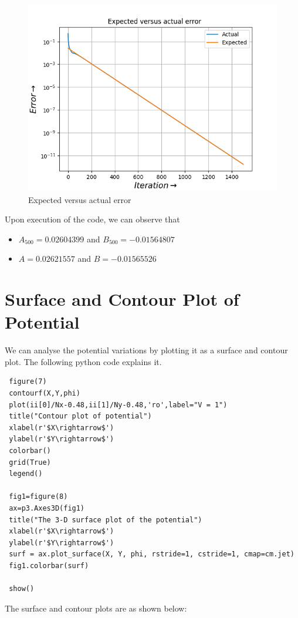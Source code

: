 \documentclass[11pt, a4paper]{article}
\begin{document}
\begin{figure}[!tbh]
 \centering
 \includegraphics[scale=0.7]{Figure_6.png}  
 \caption{Expected versus actual error}
\end{figure}

\newpage
Upon execution of the code, we can observe that 
\begin{itemize}
\item
$ A_{500} = 0.02604399$ and $B_{500} = -0.01564807 $ 

\item
$A = 0.02621557$ and $B = -0.01565526$

\end{itemize}


\section{Surface and Contour Plot of Potential}

We can analyse the potential variations by plotting it as a surface and contour plot. The following python code explains it. 
\begin{verbatim}
 figure(7)
 contourf(X,Y,phi)
 plot(ii[0]/Nx-0.48,ii[1]/Ny-0.48,'ro',label="V = 1")
 title("Contour plot of potential")
 xlabel(r'$X\rightarrow$')
 ylabel(r'$Y\rightarrow$')
 colorbar()
 grid(True)
 legend()
 
 fig1=figure(8)
 ax=p3.Axes3D(fig1) 
 title("The 3-D surface plot of the potential")
 xlabel(r'$X\rightarrow$')
 ylabel(r'$Y\rightarrow$')
 surf = ax.plot_surface(X, Y, phi, rstride=1, cstride=1, cmap=cm.jet)
 fig1.colorbar(surf)
 
 show()
  \end{verbatim}
\newpage
The surface and contour plots are as shown below:
\end{document}
